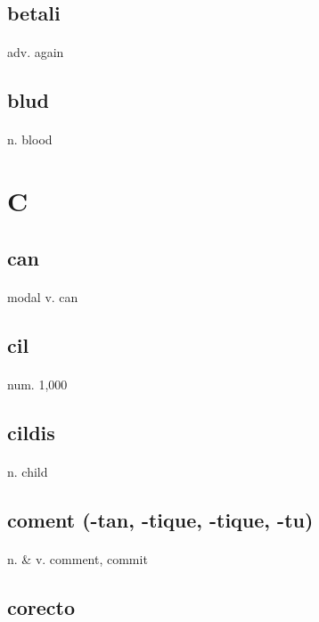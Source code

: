 \documentclass[UTF8]{article}
\begin{document}
    \subsection{betali}
    \paragraph{} adv. again 
    \subsection{blud}
    \paragraph{} n. blood 
    \newpage \section{C}
    \subsection{can}
    \paragraph{} modal v. can 
    \subsection{cil}
    \paragraph{} num. 1,000 
    \subsection{cildis}
    \paragraph{} n. child 
    \subsection{coment (-tan, -tique, -tique, -tu)}
    \paragraph{} n. \& v. comment, commit 
    \subsection{corecto}
\end{document}
